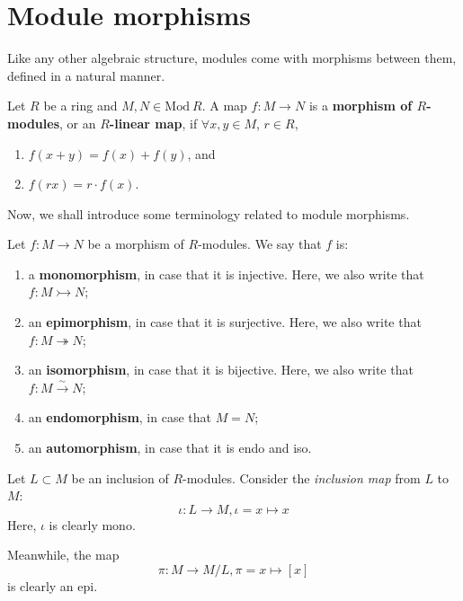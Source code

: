 \documentclass[12pt, a4paper, titlepage]{report}
\begin{document}
\section{Module morphisms}

Like any other algebraic structure, modules come with morphisms between them, defined in a natural manner.

\begin{defn}
  Let $R$ be a ring and $M, N \in \mathrm{Mod} \ R$. A map $f : M \rightarrow N$ is a \textbf{morphism of $R$-modules},
  or an \textbf{$R$-linear map}, if $\forall x, y \in M$, $r \in R$,

  \begin{enumerate}
  \item $f(x + y) = f(x) + f(y)$, and
  \item $f(rx) = r \cdot f(x)$.
  \end{enumerate}
\end{defn}

Now, we shall introduce some terminology related to module morphisms.

\begin{defn}
  Let $f : M \rightarrow N$ be a morphism of $R$-modules. We say that $f$ is:
  \begin{enumerate}
  \item a \textbf{monomorphism}, in case that it is injective. Here,
    we also write that $f : M \rightarrowtail N$;
  \item an \textbf{epimorphism}, in case that it is surjective. Here,
    we also write that $f : M \twoheadrightarrow N$;
  \item an \textbf{isomorphism}, in case that it is bijective. Here,
    we also write that $f : M \xrightarrow{\sim} N$;
  \item an \textbf{endomorphism}, in case that $M = N$;
  \item an \textbf{automorphism}, in case that it is endo and iso.
  \end{enumerate}
\end{defn}

\begin{rem}
  Let $L \subset M$ be an inclusion of $R$-modules. Consider the \textit{inclusion map} from
  $L$ to $M$:
  \[
    \iota : L \rightarrow M, \iota = x \mapsto x
  \]
  Here, $\iota$ is clearly mono.

  Meanwhile, the map
  \[
    \pi : M \rightarrow M/L, \pi = x \mapsto [x]
  \]
  is clearly an epi.
\end{rem}
\end{document}
